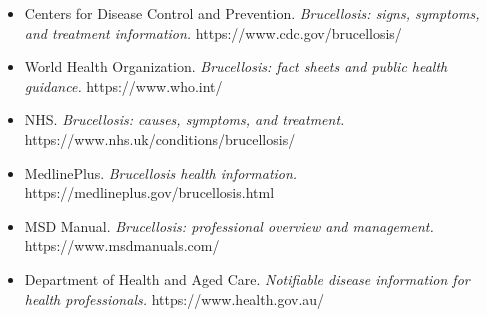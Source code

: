 \begin{itemize}
    \item Centers for Disease Control and Prevention. \textit{Brucellosis: signs, symptoms, and treatment information.} https://www.cdc.gov/brucellosis/
    \item World Health Organization. \textit{Brucellosis: fact sheets and public health guidance.} https://www.who.int/
    \item NHS. \textit{Brucellosis: causes, symptoms, and treatment.} https://www.nhs.uk/conditions/brucellosis/
    \item MedlinePlus. \textit{Brucellosis health information.} https://medlineplus.gov/brucellosis.html
    \item MSD Manual. \textit{Brucellosis: professional overview and management.} https://www.msdmanuals.com/
    \item Department of Health and Aged Care. \textit{Notifiable disease information for health professionals.} https://www.health.gov.au/
\end{itemize}
